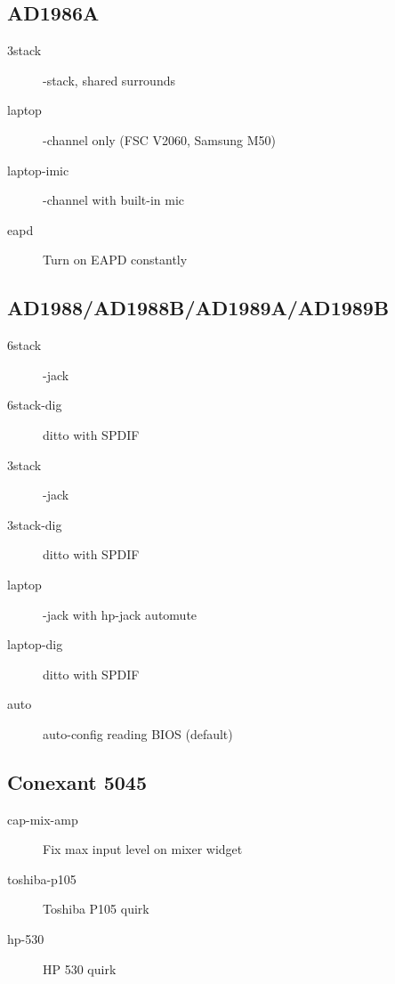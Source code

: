 \documentclass[a4paper,8pt,english]{sphinxmanual}
\begin{document}
\subsection{AD1986A}
\label{sound/hd-audio/models:ad1986a}\begin{description}
\item[{3stack}] -stack, shared surrounds

\item[{laptop}] -channel only (FSC V2060, Samsung M50)

\item[{laptop-imic}] -channel with built-in mic

\item[{eapd}] \leavevmode
Turn on EAPD constantly

\end{description}


\subsection{AD1988/AD1988B/AD1989A/AD1989B}
\label{sound/hd-audio/models:ad1988-ad1988b-ad1989a-ad1989b}\begin{description}
\item[{6stack}] -jack

\item[{6stack-dig}] \leavevmode
ditto with SPDIF

\item[{3stack}] -jack

\item[{3stack-dig}] \leavevmode
ditto with SPDIF

\item[{laptop}] -jack with hp-jack automute

\item[{laptop-dig}] \leavevmode
ditto with SPDIF

\item[{auto}] \leavevmode
auto-config reading BIOS (default)

\end{description}


\subsection{Conexant 5045}
\label{sound/hd-audio/models:conexant-5045}\begin{description}
\item[{cap-mix-amp}] \leavevmode
Fix max input level on mixer widget

\item[{toshiba-p105}] \leavevmode
Toshiba P105 quirk

\item[{hp-530}] \leavevmode
HP 530 quirk

\end{description}
\end{document}
